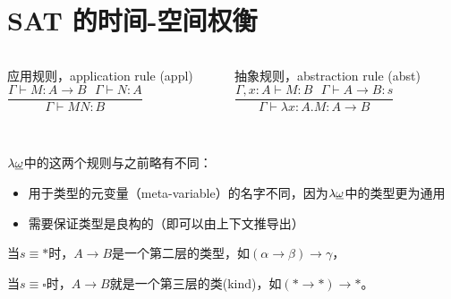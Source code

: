 \documentclass[UTF8,aspectratio=169,mathserif]{beamer}
\begin{document}
	\section{SAT 的时间-空间权衡}
	\begin{frame}
		\begin{columns}
			\begin{column}{0.48\textwidth}
				\begin{exampleblock}{应用规则，application rule}
					(appl) $\dfrac{\Gamma\vdash M:A\rightarrow B\ \ \ \Gamma\vdash N:A}{\Gamma\vdash MN:B}$
				\end{exampleblock}
			\end{column}
			\begin{column}{0.48\textwidth}
				\begin{exampleblock}{抽象规则，abstraction rule}
					(abst) $\dfrac{\Gamma,x:A\vdash M:B\ \ \ \Gamma\vdash A\rightarrow B:s}{\Gamma\vdash\lambda x:A.M:A\rightarrow B}$
				\end{exampleblock}
			\end{column}
		\end{columns}
		
		\hspace*{\fill} \\
		
		$\lambda{\uline{\omega}}$中的这两个规则与之前略有不同：
		
		\begin{itemize}
			\item 用于类型的元变量（meta-variable）的名字不同，因为$\lambda{\uline{\omega}}$中的类型更为通用
			
			\item 需要保证类型是良构的（即可以由上下文推导出）
		\end{itemize}
		
		当$s\equiv*$时，$A\rightarrow B$是一个第二层的类型，如$(\alpha\rightarrow\beta)\rightarrow\gamma$，
		
		当$s\equiv\square$时，$A\rightarrow B$就是一个第三层的类(kind)，如$(*\rightarrow*)\rightarrow*$。
	\end{frame}
	
	
	
\end{document}
